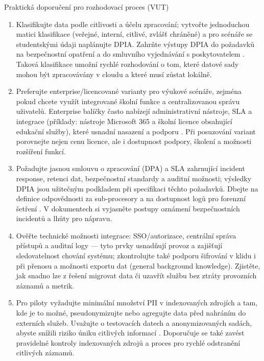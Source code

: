 Praktická doporučení pro rozhodovací proces (VUT)
\begin{enumerate}
\item Klasifikujte data podle citlivosti a účelu zpracování; vytvořte jednoduchou matici klasifikace (veřejné, interní, citlivé, zvlášť chráněné) a pro scénáře se studentskými údaji naplánujte DPIA. Zahrňte výstupy DPIA do požadavků na bezpečnostní opatření a do smluvního vyjednávání s poskytovatelem \cite{kb_malinka_chatgpt_ve_vyuce_dva_roky_pote_2024_pdf_90bc3aaf_page_12_1}. Taková klasifikace umožní rychlé rozhodování o tom, které datové sady mohou být zpracovávány v cloudu a které musí zůstat lokálně.
\item Preferujte enterprise/licencované varianty pro výukové scénáře, zejména pokud chcete využít integrované školní funkce a centralizovanou správu uživatelů. Enterprise balíčky často nabízejí administrativní nástroje, SLA a integrace (příklady: nástroje Microsoft 365 a školní licence obsahující edukační služby), které usnadní nasazení a podporu \cite{kb_ai_101_tipu_pdf_04e4a115_page_15_2,kb_ai_101_tipu_pdf_04e4a115_page_36_1}. Při posuzování variant porovnejte nejen cenu licence, ale i dostupnost podpory, školení a možnosti rozšíření funkcí.
\item Požadujte jasnou smlouvu o zpracování (DPA) a SLA zahrnující incident response, retenci dat, bezpečnostní standardy a auditní možnosti; výsledky DPIA jsou užitečným podkladem při specifikaci těchto požadavků. Dbejte na definice odpovědnosti za sub‑procesory a na dostupnost logů pro forenzní šetření \cite{kb_ai_101_tipu_pdf_04e4a115_page_8_1,kb_malinka_chatgpt_ve_vyuce_dva_roky_pote_2024_pdf_90bc3aaf_page_12_1}. V dokumentech si vyjasněte postupy oznámení bezpečnostních incidentů a lhůty pro nápravu.
\item Ověřte technické možnosti integrace: SSO/autorizace, centrální správa přístupů a auditní logy — tyto prvky usnadňují provoz a zajišťují sledovatelnost chování systému; zkontrolujte také podporu šifrování v klidu i při přenosu a možnosti exportu dat (general background knowledge). Zjistěte, jak snadno lze z řešení migrovat data či uzavřít službu bez ztráty provozních záznamů a metrik.
\item Pro piloty vyžadujte minimální množství PII v indexovaných zdrojích a tam, kde je to možné, pseudonymizujte nebo agregujte data před nahráním do externích služeb. Uvažujte o testovacích datech a anonymizovaných sadách, abyste snížili riziko úniku citlivých informací \cite{kb_ai_101_tipu_pdf_04e4a115_page_8_1}. Doporučuje se také zavést pravidelné kontroly indexovaných zdrojů a proces pro rychlé odstranění citlivých záznamů.
\end{enumerate}

